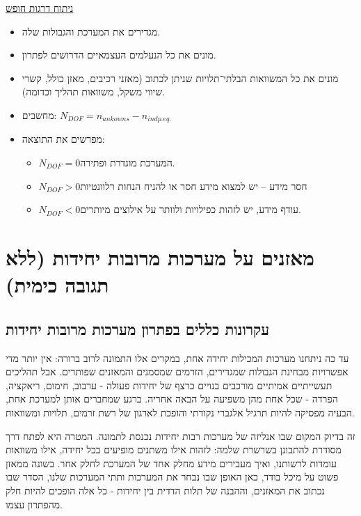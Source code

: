 \documentclass[
  hebrew,
  letterpaper,
  DIV=11,
  numbers=noendperiod]{scrreprt}
\begin{document}
\ul{ניתוח דרגות חופש}

\begin{itemize}
\item
  מגדירים את המערכת והגבולות שלה.
\item
  מונים את כל הנעלמים העצמאיים הדרושים לפתרון.
\item
  מונים את כל המשוואות הבלתי־תלויות שניתן לכתוב (מאזני רכיבים, מאזן
  כולל, קשרי שיווי משקל, משוואות תהליך וכדומה).
\item
  מחשבים: \(N_{DOF} = n_{unkowns} - n_{indp.eq.}\)
\item
  מפרשים את התוצאה:

  \begin{itemize}
  \item
    \(N_{DOF} = 0\)המערכת מוגדרת ופתירה.
  \item
    \(N_{DOF} > 0\)חסר מידע -- יש למצוא מידע חסר או להניח הנחות
    רלוונטיות
  \item
    \(N_{DOF} < 0\)עודף מידע, יש לזהות כפילויות ולוותר על אילוצים
    מיותרים.
  \end{itemize}
\end{itemize}

\section{מאזנים על מערכות מרובות יחידות (ללא תגובה
כימית)}\label{ux5deux5d0ux5d6ux5e0ux5d9ux5dd-ux5e2ux5dc-ux5deux5e2ux5e8ux5dbux5d5ux5ea-ux5deux5e8ux5d5ux5d1ux5d5ux5ea-ux5d9ux5d7ux5d9ux5d3ux5d5ux5ea-ux5dcux5dcux5d0-ux5eaux5d2ux5d5ux5d1ux5d4-ux5dbux5d9ux5deux5d9ux5ea}

\subsection{עקרונות כללים בפתרון מערכות מרובות
יחידות}\label{ux5e2ux5e7ux5e8ux5d5ux5e0ux5d5ux5ea-ux5dbux5dcux5dcux5d9ux5dd-ux5d1ux5e4ux5eaux5e8ux5d5ux5df-ux5deux5e2ux5e8ux5dbux5d5ux5ea-ux5deux5e8ux5d5ux5d1ux5d5ux5ea-ux5d9ux5d7ux5d9ux5d3ux5d5ux5ea}

עד כה ניתחנו מערכות המכילות יחידה אחת, במקרים אלו התמונה לרוב ברורה: אין
יותר מדי אפשרויות מבחינת הגבולות שמגדירים, הזרמים שמסמנים והמאזנים
שפותרים. אבל תהליכים תעשייתיים אמיתיים מורכבים בנויים כרצף של יחידות
פעולה - ערבוב, חימום, ריאקציה, הפרדה - שכל אחת מהן משפיעה על הבאה אחריה.
ברגע שמחברים אותן למערכת אחת, הבעיה מפסיקה להיות תרגיל אלגברי נקודתי
והופכת לארגון של רשת זרמים, תלויות ומשוואות.

זה בדיוק המקום שבו אנליזה של מערכות רבות יחידות נכנסת לתמונה. המטרה היא
לפתח דרך מסודרת להתבונן בשרשרת שלמה: לזהות אילו משתנים מופיעים בכל
יחידה, אילו משוואות עומדות לרשותנו, ואיך מעבירים מידע מחלק אחד של המערכת
לחלק אחר. בשונה ממאזן פשוט על מיכל בודד, כאן האופן שבו נבחר את המערכות
ותתי המערכות שלנו, הסדר שבו נכתוב את המאזנים, וההבנה של תלות הדדית בין
יחידות - כל אלה הופכים להיות חלק מהפתרון עצמו.
\end{document}
